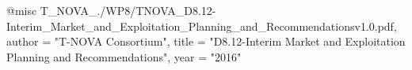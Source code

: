 @misc{ T_NOVA_./WP8/TNOVA_D8.12-Interim_Market_and_Exploitation_Planning_and_Recommendationsv1.0.pdf,
       author = "T-NOVA Consortium",
       title = "D8.12-Interim Market and Exploitation Planning and Recommendations",
       year = "2016" }
